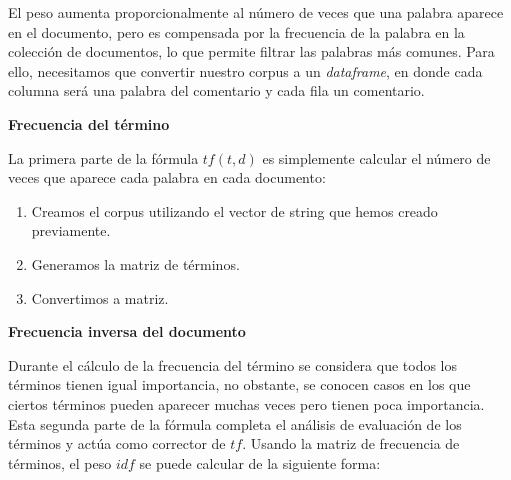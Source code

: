\documentclass[spanish,]{article}
\providecommand{\tightlist}{%
  \setlength{\itemsep}{0pt}\setlength{\parskip}{0pt}}
\begin{document}
El peso aumenta proporcionalmente al número de veces que una palabra
aparece en el documento, pero es compensada por la frecuencia de la
palabra en la colección de documentos, lo que permite filtrar las
palabras más comunes. Para ello, necesitamos que convertir nuestro
corpus a un \emph{dataframe}, en donde cada columna será una palabra del
comentario y cada fila un comentario.

\textbf{Frecuencia del término}

La primera parte de la fórmula \(tf(t, d)\) es simplemente calcular el
número de veces que aparece cada palabra en cada documento:

\begin{enumerate}
\def\labelenumi{\arabic{enumi}.}
\tightlist
\item
  Creamos el corpus utilizando el vector de string que hemos creado
  previamente.
\item
  Generamos la matriz de términos.
\item
  Convertimos a matriz.
\end{enumerate}

\textbf{Frecuencia inversa del documento}

Durante el cálculo de la frecuencia del término se considera que todos
los términos tienen igual importancia, no obstante, se conocen casos en
los que ciertos términos pueden aparecer muchas veces pero tienen poca
importancia. Esta segunda parte de la fórmula completa el análisis de
evaluación de los términos y actúa como corrector de \(tf\). Usando la
matriz de frecuencia de términos, el peso \(idf\) se puede calcular de
la siguiente forma:
\end{document}
